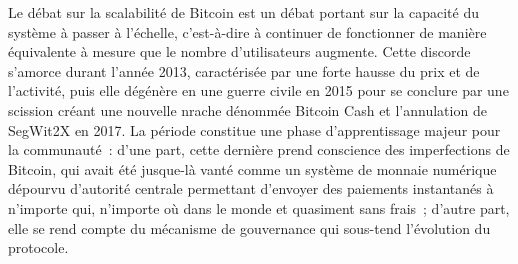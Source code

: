 Le débat sur la scalabilité de Bitcoin est un débat portant sur la capacité du système à passer à l'échelle, c'est-à-dire à continuer de fonctionner de manière équivalente à mesure que le nombre d'utilisateurs augmente. Cette discorde s'amorce durant l'année 2013, caractérisée par une forte hausse du prix et de l'activité, puis elle dégénère en une guerre civile en 2015 pour se conclure par une scission créant une nouvelle nrache dénommée Bitcoin Cash et l'annulation de SegWit2X en 2017. La période constitue une phase d'apprentissage majeur pour la communauté~: d'une part, cette dernière prend conscience des imperfections de Bitcoin, qui avait été jusque-là vanté comme un système de monnaie numérique dépourvu d'autorité centrale permettant d'envoyer des paiements instantanés à n'importe qui, n'importe où dans le monde et quasiment sans frais~; d'autre part, elle se rend compte du mécanisme de gouvernance qui sous-tend l'évolution du protocole.

%

